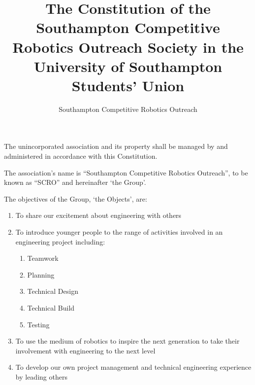 \documentclass[12pt]{constitution}
\begin{document}

\title{The Constitution of the Southampton Competitive Robotics Outreach Society in the University of Southampton Students' Union}
\author{Southampton Competitive Robotics Outreach}
\maketitle


\label{article:adoption-constitution}

The unincorporated association and its property shall be managed by and administered in accordance with this Constitution.


\label{article:name}

The association's name is ``Southampton Competitive Robotics Outreach'', to be known as ``SCRO'' and hereinafter `the Group'.


\label{article:objects}

The objectives of the Group, `the Objects', are:

\begin{enumerate}
    \item To share our excitement about engineering with others
    \item To introduce younger people to the range of activities involved in an engineering project including:
    \begin{enumerate}
        \item Teamwork
        \item Planning
        \item Technical Design
        \item Technical Build
        \item Testing
    \end{enumerate}
    \item To use the medium of robotics to inspire the next generation to take their involvement with engineering to the next level
    \item To develop our own project management and technical engineering experience by leading others
\end{enumerate}

\end{document}
